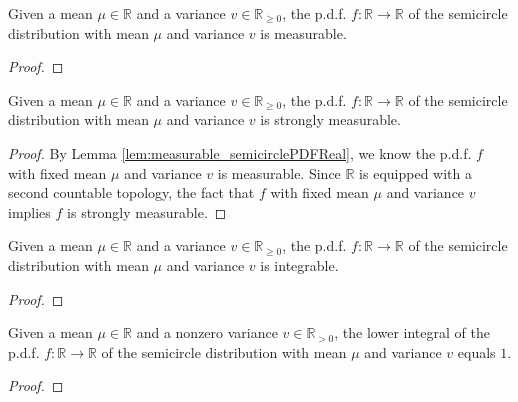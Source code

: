 \begin{lemma}\label{lem:measurable_semicirclePDFReal}
    \uses{}
    \notready
    Given a mean $\mu \in \mathbb{R}$ and a variance $v \in \mathbb{R}_{\geq 0}$, the p.d.f. $f : \mathbb{R} \rightarrow \mathbb{R}$ 
    of the semicircle distribution with mean $\mu$ and variance $v$ is measurable.
\end{lemma}
\begin{proof}
\end{proof}
\begin{lemma}\label{lem:stronglyMeasurable_semicirclePDFReal}
    \mathlibok
    Given a mean $\mu \in \mathbb{R}$ and a variance $v \in \mathbb{R}_{\geq 0}$, the p.d.f. $f : \mathbb{R} \rightarrow \mathbb{R}$ 
    of the semicircle distribution with mean $\mu$ and variance $v$ is strongly measurable.
\end{lemma}
\begin{proof}
    By Lemma \ref{lem:measurable_semicirclePDFReal}, we know the p.d.f. $f$ with fixed mean $\mu$ and variance $v$ is measurable.
    Since $\mathbb{R}$ is equipped with a second countable topology, the fact that $f$ with fixed mean $\mu$ and variance $v$ implies $f$ is strongly measurable.  
\end{proof}
\begin{lemma}\label{lem:integrable_semicirclePDFReal}
    \notready
    Given a mean $\mu \in \mathbb{R}$ and a variance $v \in \mathbb{R}_{\geq 0}$, the p.d.f. $f : \mathbb{R} \rightarrow \mathbb{R}$ 
    of the semicircle distribution with mean $\mu$ and variance $v$ is integrable.
\end{lemma}
\begin{proof}
\end{proof}
\begin{lemma}\label{lem:lintegral_semicirclePDFReal_eq_one}
    \notready
    Given a mean $\mu \in \mathbb{R}$ and a nonzero variance $v \in \mathbb{R}_{> 0}$, the lower integral of the p.d.f. $f : \mathbb{R} \rightarrow \mathbb{R}$ 
    of the semicircle distribution with mean $\mu$ and variance $v$ equals $1$.
\end{lemma}
\begin{proof}
\end{proof}
